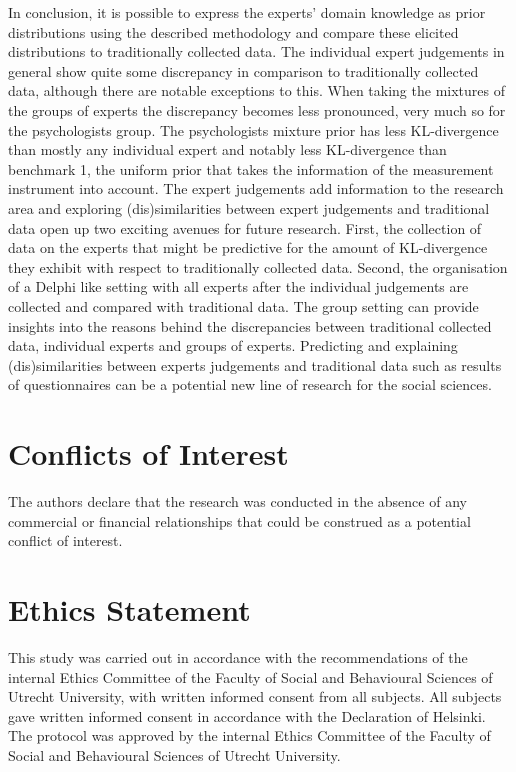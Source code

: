 \documentclass[openright,titlepage,12pt,a4paper]{book}
\begin{document}
In conclusion, it is possible to express the experts' domain knowledge as prior distributions using the described methodology and compare these elicited distributions to traditionally collected data. The individual expert judgements in general show quite some discrepancy in comparison to traditionally collected data, although there are notable exceptions to this. When taking the mixtures of the groups of experts the discrepancy becomes less pronounced, very much so for the psychologists group. The psychologists mixture prior has less KL-divergence than mostly any individual expert and notably less KL-divergence than benchmark 1, the uniform prior that takes the information of the measurement instrument into account. The expert judgements add information to the research area and exploring (dis)similarities between expert judgements and traditional data open up two exciting avenues for future research. First, the collection of data on the experts that might be predictive for the amount of KL-divergence they exhibit with respect to traditionally collected data. Second, the organisation of a Delphi like setting with all experts after the individual judgements are collected and compared with traditional data. The group setting can provide insights into the reasons behind the discrepancies between traditional collected data, individual experts and groups of experts. Predicting and explaining (dis)similarities between experts judgements and traditional data such as results of questionnaires can be a potential new line of research for the social sciences.

\newpage

\hypertarget{conflicts-of-interest}{%
\section*{Conflicts of Interest}\label{conflicts-of-interest}}

The authors declare that the research was conducted in the absence of any commercial or financial relationships that could be construed as a potential conflict of interest.

\hypertarget{ethics-statement}{%
\section*{Ethics Statement}\label{ethics-statement}}

This study was carried out in accordance with the recommendations of the internal Ethics Committee of the Faculty of Social and Behavioural Sciences of Utrecht University, with written informed consent from all subjects. All subjects gave written informed consent in accordance with the Declaration of Helsinki. The protocol was approved by the internal Ethics Committee of the Faculty of Social and Behavioural Sciences of Utrecht University.
\end{document}
